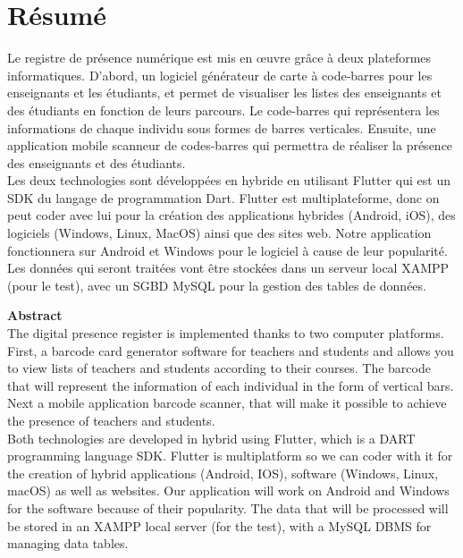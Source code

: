\chapter*{Résumé}
{}


\indent Le registre de présence numérique est mis en œuvre grâce à deux plateformes informatiques. D’abord, un logiciel générateur de carte à code-barres pour les enseignants et les étudiants, et permet de visualiser les listes des enseignants et des étudiants en fonction de leurs parcours. Le code-barres qui représentera les informations de chaque individu sous formes de barres verticales. Ensuite, une application mobile scanneur de codes-barres qui permettra de réaliser la présence des enseignants et des étudiants. 
\\

Les deux technologies sont développées en hybride en utilisant Flutter qui est un SDK du langage de programmation Dart. Flutter est multiplateforme, donc on peut coder avec lui pour la création des applications hybrides (Android, iOS), des logiciels (Windows, Linux, MacOS) ainsi que des sites web. Notre application fonctionnera sur Android et Windows pour le logiciel à cause de leur popularité.
\\

Les données qui seront traitées vont être stockées dans un serveur local XAMPP (pour le test), avec un SGBD MySQL pour la gestion des tables de données.  



\vspace{1cm}

{\Huge \textbf{Abstract}} \\ 

\indent The digital presence register is implemented thanks to two computer platforms. First, a barcode card generator software for teachers and students and allows you to view lists of teachers and students according to their courses. The barcode that will represent the information of each individual in the form of vertical bars. Next a mobile application barcode scanner, that will make it possible to achieve the presence of teachers and students.
\\

Both technologies are developed in hybrid using Flutter, which is a DART programming language SDK. Flutter is multiplatform so we can coder with it for the creation of hybrid applications (Android, IOS), software (Windows, Linux, macOS) as well as websites. Our application will work on Android and Windows for the software because of their popularity.
The data that will be processed will be stored in an XAMPP local server (for the test), with a MySQL DBMS for managing data tables.